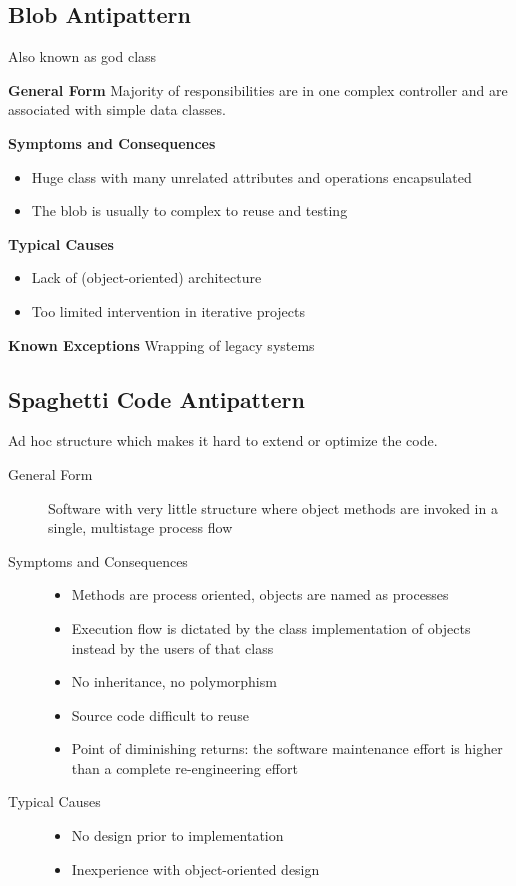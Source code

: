 \subsection{Blob Antipattern}
Also known as god class
\begin{description}
  \item \textbf{General Form} Majority of responsibilities are in one complex controller and are associated with simple data classes.
  \item \textbf{Symptoms and Consequences}
  \begin{itemize}
    \item Huge class with many unrelated attributes and operations encapsulated
    \item The blob is usually to complex to reuse and testing
  \end{itemize}
  \item \textbf{Typical Causes}
  \begin{itemize}
    \item Lack of (object-oriented) architecture
    \item Too limited intervention in iterative projects
  \end{itemize}
  \item \textbf{Known Exceptions} Wrapping of legacy systems
\end{description}
\newpage

\subsection{Spaghetti Code Antipattern}
Ad hoc structure which makes it hard to extend or optimize the code.
\begin{description}
  \item[General Form] Software with very little structure where object methods are invoked in a single, multistage process flow
  \item[Symptoms and Consequences] \hfill
  \begin{itemize}
    \item Methods are process oriented, objects are named as processes
    \item Execution flow is dictated by the class implementation of objects instead by the users of that class
    \item No inheritance, no polymorphism
    \item Source code difficult to reuse
    \item Point of diminishing returns: the software maintenance effort is higher than a complete re-engineering effort
  \end{itemize}
  \item[Typical Causes] \hfill
  \begin{itemize}
    \item No design prior to implementation
    \item Inexperience with object-oriented design
  \end{itemize}
\end{description}
\newpage

